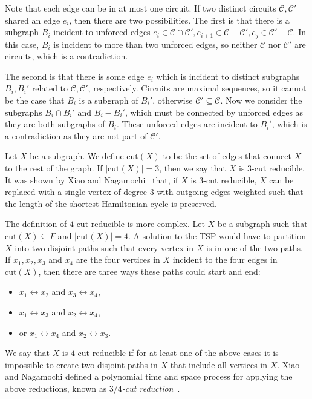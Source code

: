Note that each edge can be in at most one circuit. If two distinct circuits $\mathcal{C}, \mathcal{C}'$ shared an edge $e_i$, then there are two possibilities. The first is that there is a subgraph $B_i$ incident to unforced edges $e_i \in \mathcal{C} \cap \mathcal{C}', e_{i+1} \in \mathcal{C} - \mathcal{C}', e_j \in \mathcal{C}' - \mathcal{C}$. In this case, $B_i$ is incident to more than two unforced edges, so neither $\mathcal{C}$ nor $\mathcal{C}'$ are circuits, which is a contradiction.

The second is that there is some edge $e_i$ which is incident to distinct subgraphs $B_i, B_i'$ related to $\mathcal{C}, \mathcal{C}'$, respectively. Circuits are maximal sequences, so it cannot be the case that $B_i$ is a subgraph of $B_i'$, otherwise $\mathcal{C}' \subseteq \mathcal{C}$. Now we consider the subgraphs $B_i \cap B_i'$ and $B_i - B_i'$, which must be connected by unforced edges as they are both subgraphs of $B_i$. These unforced edges are incident to $B_i'$, which is a contradiction as they are not part of $\mathcal{C}'$.

Let $X$ be a subgraph. We define $\text{cut}(X)$ to be the set of edges that connect $X$ to the rest of the graph. If $|\text{cut}(X)| = 3$, then we say that $X$ is $3$-cut reducible. It was shown by Xiao and Nagamochi~\cite{xiao2016degree3} that, if $X$ is 3-cut reducible, $X$ can be replaced with a single vertex of degree $3$ with outgoing edges weighted such that the length of the shortest Hamiltonian cycle is preserved.

The definition of $4$-cut reducible is more complex. Let $X$ be a subgraph such that $\text{cut}(X) \subseteq F$ and $|\text{cut}(X)| = 4$. A solution to the TSP would have to partition $X$ into two disjoint paths such that every vertex in $X$ is in one of the two paths. If $x_1, x_2, x_3$ and $x_4$ are the four vertices in $X$ incident to the four edges in $\text{cut}(X)$, then there are three ways these paths could start and end:
%
\begin{itemize}
\item $x_1 \leftrightarrow x_2$ and $x_3 \leftrightarrow x_4$,
\item $x_1 \leftrightarrow x_3$ and $x_2 \leftrightarrow x_4$,
\item or $x_1 \leftrightarrow x_4$ and $x_2 \leftrightarrow x_3$.
\end{itemize}
%
We say that $X$ is $4$-cut reducible if for at least one of the above cases it is impossible to create two disjoint paths in $X$ that include all vertices in $X$. Xiao and Nagamochi defined a polynomial time and space process for applying the above reductions, known as {\em $3/4$-cut reduction}~\cite{xiao2016degree3}.

